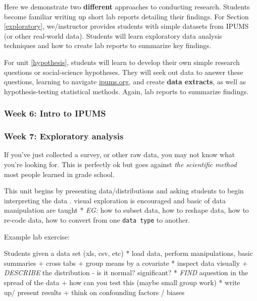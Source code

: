 \documentclass[
]{book}
\begin{document}
Here we demonstrate two \textbf{different} approaches to conducting research. Students become familiar writing up short lab reports detailing their findings. For Section \ref{exploratory}, we/instructor provides students with simple datasets from IPUMS (or other real-world data). Students will learn exploratory data analysis techniques and how to create lab reports to summarize key findings.

For unit \ref{hypothesis}, students will learn to develop their own simple research questions or social-science hypotheses. They will seek out data to answer these questions, learning to navigate \href{https://ipums.org}{ipums.org}, and create \textbf{data extracts}, as well as hypothesis-testing statistical methods. Again, lab reports to summarize findings.

\hypertarget{week-6-intro-to-ipums}{%
\subsubsection{Week 6: Intro to IPUMS}\label{week-6-intro-to-ipums}}

\hypertarget{week-7-exploratory-analysis}{%
\subsubsection*{Week 7: Exploratory analysis}\label{week-7-exploratory-analysis}}

If you've just collected a survey, or other raw data, you may not know what you're looking for. This is perfectly ok but goes against \emph{the scientific method} most people learned in grade school.

This unit begins by presenting data/distributions and asking students to begin interpreting the data . visual exploration is encouraged and basic of data manipulation are taught
* \emph{EG:} how to subset data, how to reshape data, how to re-code data, how to convert from one \texttt{data\ type} to another.

Example lab exercise:

Students given a data set (xls, csv, etc)
* load data, perform manipulations, basic summaries
+ cross tabs
+ group means by a covariate
* inspect data visually
+ \emph{DESCRIBE} the distribution - is it normal? significant?
* \emph{FIND} aquestion in the spread of the data
+ how can you test this (maybe small group work)
* write up/ present results
+ think on confounding factors / biases
\end{document}

